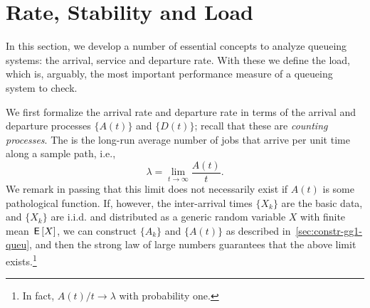 \section{Rate, Stability and Load}
\label{sec:rate-stability}



In this section, we develop a number of essential concepts to analyze queueing systems: the arrival, service and departure rate.
With these we define the load, which is, arguably, the most important performance measure of a queueing system to check.



We first formalize the arrival rate and departure rate in terms of the arrival and departure processes $\{A(t)\}$ and $\{D(t)\}$; recall that these are \emph{counting processes}.
The  is the long-run average number of jobs that arrive per unit time along a sample path, i.e.,
\begin{equation}
 \label{eq:3}
 \lambda = \lim_{t\to\infty} \frac{A(t)}t.
\end{equation}
We remark in passing that this limit does not necessarily exist if $A(t)$ is some pathological function.
If, however, the inter-arrival times $\{X_k\}$ are the basic data, and $\{X_k\}$ are i.i.d.
and distributed as a generic random variable $X$ with finite mean $\,\mathsf{E}\left[X\right]$, we can construct $\{A_k\}$ and $\{A(t)\}$ as described in~\cref{sec:constr-gg1-queu}, and then the strong law of large numbers guarantees that the above limit exists.\footnote{In fact, $A(t)/t \to \lambda$ with probability one.}

